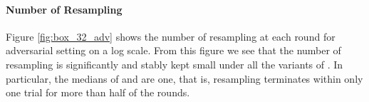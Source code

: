 

\paragraph{Number of Resampling}
Figure \ref{fig:box_32_adv} shows the number of resampling at each round for adversarial setting on a log scale.
From this figure we see that the number of resampling is significantly and stably kept small under all the variants of {}.
In particular, the medians of \CGRIIU{} and \CGRIIB{} are one, that is, resampling terminates within only one trial for more than half of the rounds.





